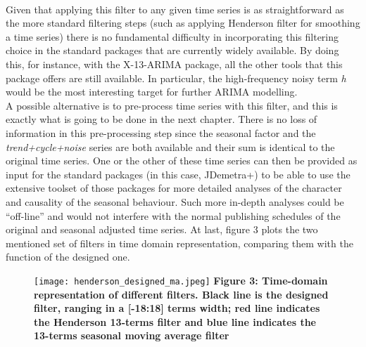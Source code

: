 \documentclass{article}
\begin{document}
\\Given that applying this filter to any given time series is as straightforward as the more standard filtering steps (such as applying Henderson filter for smoothing a time series) there is no fundamental difficulty in incorporating this filtering choice in the standard packages that are currently widely available. By doing this, for instance, with the X-13-ARIMA package, all the other tools that this package offers are still available. In particular, the high-frequency noisy term \textit{h} would be the most interesting target for further ARIMA modelling. \\A possible alternative is to pre-process time series with this filter, and this is exactly what is going to be done in the next chapter. There is no loss of information in this pre-processing step since the seasonal factor and the \textit{trend+cycle+noise} series are both available and their sum is identical to the original time series. One or the other of these time series can then be provided as input for the standard packages (in this case, JDemetra+) to be able to use the extensive toolset of those packages for more detailed analyses of the character and causality of the seasonal behaviour. Such more in-depth analyses could be ``off-line'' and would not interfere with the normal publishing schedules of the original and seasonal adjusted time series.
At last, figure 3 plots the two mentioned set of filters in time domain representation, comparing them with the function of the designed one.
 \begin{figure}[H]
  \texttt{[image: henderson\_designed\_ma.jpeg]}
  {\textbf{\scriptsize Figure 3: Time-domain representation of different filters. Black line is the designed filter, ranging in a [-18:18] terms width; red line indicates the Henderson 13-terms filter and blue line indicates the 13-terms seasonal moving average filter}}
\end{figure}
\end{document}
